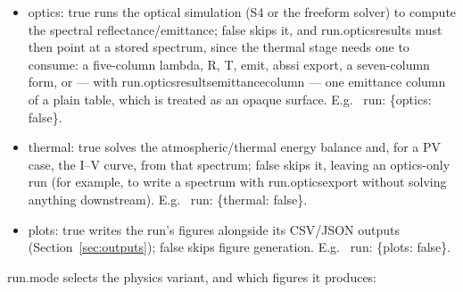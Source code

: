 \documentclass[11pt,a4paper,twoside]{article}
\DeclareRobustCommand{\code}[1]{\begingroup\upshape\ttfamily
  \def\_{\allowbreak\textunderscore\allowbreak}#1\endgroup}
\begin{document}
\begin{itemize}
  \item \code{optics: true} runs the optical simulation (S4 or the freeform
        solver) to compute the spectral reflectance/emittance; \code{false}
        skips it, and \code{run.optics\_results} must then point at a stored
        spectrum, since the thermal stage needs one to consume: a five-column
        \code{lambda, R, T, emit, abs\_si} export, a seven-column form, or --- with
        \code{run.optics\_results\_emittance\_column} --- one emittance column of a
        plain table, which is treated as an opaque surface. E.g.\
        \code{run: \{optics: false\}}.
  \item \code{thermal: true} solves the atmospheric/thermal energy balance
        and, for a PV case, the I--V curve, from that spectrum; \code{false}
        skips it, leaving an optics-only run (for example, to write a
        spectrum with \code{run.optics\_export} without solving anything
        downstream). E.g.\ \code{run: \{thermal: false\}}.
  \item \code{plots: true} writes the run's figures alongside its CSV/JSON
        outputs (Section~\ref{sec:outputs}); \code{false} skips figure
        generation. E.g.\ \code{run: \{plots: false\}}.
\end{itemize}

\code{run.mode} selects the physics variant, and which figures it produces:
\end{document}
